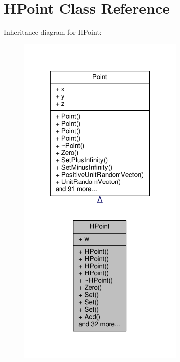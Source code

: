 \hypertarget{classHPoint}{}\section{H\+Point Class Reference}
\label{classHPoint}


Inheritance diagram for H\+Point\+:
\nopagebreak
\begin{figure}[H]
\begin{center}
\leavevmode
\includegraphics[width=230pt]{d6/d4e/classHPoint__inherit__graph}
\end{center}
\end{figure}


